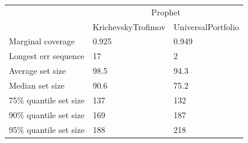\begin{tabular}{lll}
\toprule
& \multicolumn{2}{c}{Prophet} \\
& KrichevskyTrofimov & UniversalPortfolio \\
\midrule
Marginal coverage & 0.925 & 0.949 \\
Longest err sequence & 17 & 2 \\
Average set size & 98.5 & 94.3 \\
Median set size & 90.6 & 75.2 \\
75\% quantile set size & 137 & 132 \\
90\% quantile set size & 169 & 187 \\
95\% quantile set size & 188 & 218 \\
\bottomrule
\end{tabular}
